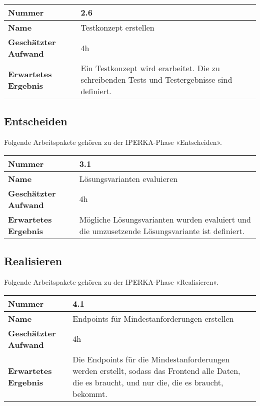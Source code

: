 \begin{longtable}{p{}|p{}}
	\hline
	\textbf{Nummer}                 & \textbf{2.6}            \\
	\hline
	\textbf{Name}   				& Testkonzept erstellen                  \\
	\hline
	\textbf{Geschätzter Aufwand}    & 4h                                    \\
	\hline
	\textbf{Erwartetes Ergebnis}    & Ein Testkonzept wird erarbeitet. Die zu schreibenden Tests und Testergebnisse sind definiert.                                    \\
	\hline
\end{longtable}\label{tab:planen-2.6}

\subsection{Entscheiden}
Folgende Arbeitspakete gehören zu der IPERKA-Phase «Entscheiden».

\begin{longtable}{p{}|p{}}
	\hline
	\textbf{Nummer}                 & \textbf{3.1}            \\
	\hline
	\textbf{Name}   				& Lösungsvarianten evaluieren                  \\
	\hline
	\textbf{Geschätzter Aufwand}    & 4h                                    \\
	\hline
	\textbf{Erwartetes Ergebnis}    & Mögliche Lösungsvarianten wurden evaluiert und die umzusetzende Lösungsvariante ist definiert.                                    \\
	\hline
\end{longtable}\label{tab:entscheiden-3.1}

\subsection{Realisieren}
Folgende Arbeitspakete gehören zu der IPERKA-Phase «Realisieren».

\begin{longtable}{p{}|p{}}
	\hline
	\textbf{Nummer}                 & \textbf{4.1}            \\
	\hline
	\textbf{Name}   				& Endpoints für Mindestanforderungen erstellen                  \\
	\hline
	\textbf{Geschätzter Aufwand}    & 4h                                    \\
	\hline
	\textbf{Erwartetes Ergebnis}    & Die Endpoints für die Mindestanforderungen werden erstellt, sodass das Frontend alle Daten, die es braucht, und nur die, die es braucht, bekommt.                                    \\
	\hline
\end{longtable}\label{tab:realisieren-4.1}


